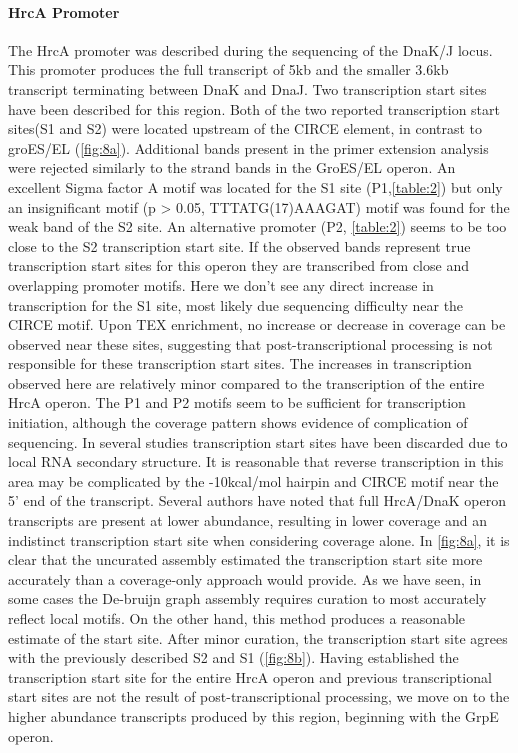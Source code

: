 \paragraph{HrcA Promoter}
The HrcA promoter was described during the sequencing of the DnaK/J locus\cite{80}. This promoter produces the full transcript of 5kb and the smaller 3.6kb transcript terminating between DnaK and DnaJ. Two transcription start sites have been described for this region\cite{80}. Both of the two reported transcription start sites(S1 and S2) were located upstream of the CIRCE element, in contrast to groES/EL (\ref{fig:8a}). Additional bands present in the primer extension analysis were rejected similarly to the strand bands in the GroES/EL operon. An excellent Sigma factor A motif was located for the S1 site (P1,\ref{table:2}) but only an insignificant motif (p > 0.05, TTTATG(17)AAAGAT) motif was found for the weak band of the S2 site. An alternative promoter (P2, \ref{table:2}) seems to be too close to the S2 transcription start site. If the observed bands represent true transcription start sites for this operon they are transcribed from close and overlapping promoter motifs. Here we don't see any direct increase in transcription for the S1 site, most likely due sequencing difficulty near the CIRCE motif. Upon TEX enrichment, no increase or decrease in coverage can be observed near these sites, suggesting that post-transcriptional processing is not responsible for these transcription start sites. The increases in transcription observed here are relatively minor compared to the transcription of the entire HrcA operon. The P1 and P2 motifs seem to be sufficient for transcription initiation, although the coverage pattern shows evidence of complication of sequencing. In several studies\cite{76,80} transcription start sites have been discarded due to local RNA secondary structure. It is reasonable that reverse transcription in this area may be complicated by the -10kcal/mol hairpin and CIRCE motif near the 5' end of the transcript. Several authors have noted that full HrcA/DnaK operon transcripts are present at lower abundance\cite{80,81}, resulting in lower coverage and an indistinct transcription start site when considering coverage alone. In \ref{fig:8a}, it is clear that the uncurated assembly estimated the transcription start site more accurately than a coverage-only approach would provide. As we have seen, in some cases the De-bruijn graph assembly requires curation to most accurately reflect local motifs. On the other hand, this method produces a reasonable estimate of the start site. After minor curation, the transcription start site agrees with the previously described\cite{79} S2 and S1 (\ref{fig:8b}). Having established the transcription start site for the entire HrcA operon and previous transcriptional start sites are not the result of post-transcriptional processing, we move on to the higher abundance transcripts produced by this region, beginning with the GrpE operon.

